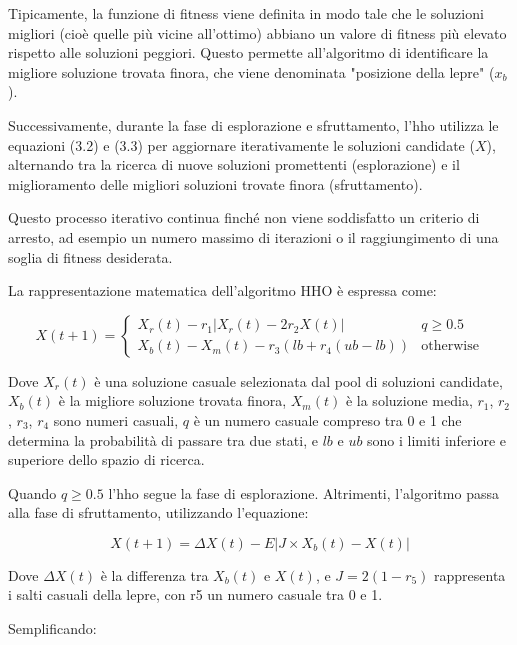 Tipicamente, la funzione di fitness viene definita in modo tale che le soluzioni migliori (cioè quelle più vicine all'ottimo) abbiano un valore di fitness più elevato rispetto alle soluzioni peggiori. Questo permette all'algoritmo di identificare la migliore soluzione trovata finora, che viene denominata "posizione della lepre" ($x_b$).

Successivamente, durante la fase di esplorazione e sfruttamento, l'\gls{hho} utilizza le equazioni (3.2) e (3.3) per aggiornare iterativamente le soluzioni candidate ($X$), alternando tra la ricerca di nuove soluzioni promettenti (esplorazione) e il miglioramento delle migliori soluzioni trovate finora (sfruttamento). 

Questo processo iterativo continua finché non viene soddisfatto un criterio di arresto, ad esempio un numero massimo di iterazioni o il raggiungimento di una soglia di fitness desiderata.

La rappresentazione matematica dell'algoritmo HHO è espressa come:

\begin{equation}
      X(t+1) =
      \begin{cases}
            X_r(t) - r_1 |X_r(t) - 2r_2 X(t)| &  q \ge 0.5 \\
            X_b(t) - X_m(t) - r_3 (lb + r_4 (ub - lb)) & \text{otherwise}
      \end{cases}
\end{equation} 

Dove $X_r(t)$  è una soluzione casuale selezionata dal pool di soluzioni candidate, $X_{b}(t)$ è la migliore soluzione trovata finora, $X_{m}(t)$ è la soluzione media, $r_1$, $r_2$, $r_3$, $r_4$ sono numeri casuali, $q$ è un numero casuale compreso tra 0 e 1 che determina la probabilità di passare tra due stati, e $lb$ e $ub$ sono i limiti inferiore e superiore dello spazio di ricerca.

Quando $q\geq0.5$ l'\gls{hho} segue la fase di esplorazione. Altrimenti, l'algoritmo passa alla fase di sfruttamento, utilizzando l'equazione:

\begin{equation}
      X(t+1) = \Delta X(t) - E|J \times X_b(t) - X(t)| 
\end{equation}

Dove $\Delta X(t)$ è la differenza tra $X_{b}(t)$ e $X(t)$, e $J = 2(1-r_{5})$ rappresenta i salti casuali della lepre, con r5 un numero casuale tra 0 e 1.

Semplificando:

